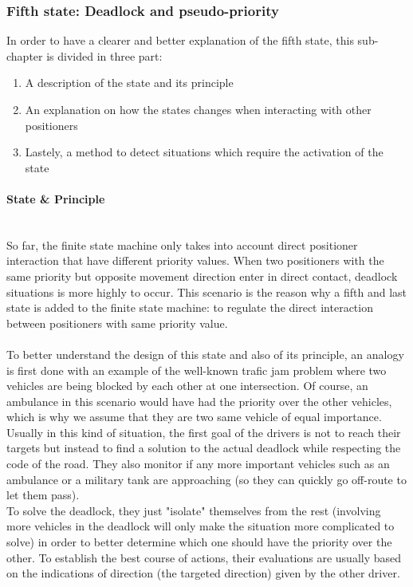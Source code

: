 \documentclass[]{spie}  %
\begin{document}
	\subsubsection{Fifth state: Deadlock and pseudo-priority}
	\label{sub_chapter_fifth_state}
	In order to have a clearer and better explanation of the fifth state, this sub-chapter is divided in three part: 
	\begin{enumerate}
		\item A description of the state and its principle 
		\item An explanation on how the states changes when interacting with other positioners
		\item Lastely, a method to detect situations which require the activation of the state
	\end{enumerate}
	
	\paragraph{State \& Principle}\mbox{}\\
	
	So far, the finite state machine only takes into account direct positioner interaction that have different priority values.
	When two positioners with the same priority but opposite movement direction enter in direct contact, deadlock situations is more highly to occur. This scenario is the reason why a fifth and last state is added to the finite state machine: to regulate the direct interaction between positioners with same priority value.\\\\	
	To better understand the design of this state and also of its principle, an analogy is first done with an example of the well-known trafic jam problem where two vehicles are being blocked by each other at one intersection. Of course, an ambulance in this scenario would have had the priority over the other vehicles, which is why we assume that they are two same vehicle of equal importance.\\
	Usually in this kind of situation, the first goal of the drivers is not to reach their targets but instead to find a solution to the actual deadlock while respecting the code of the road. They also monitor if any more important vehicles such as an ambulance or a military tank are approaching (so they can quickly go off-route to let them pass).\\ 
	To solve the deadlock, they just "isolate" themselves from the rest (involving more vehicles in the deadlock will only make the situation more complicated to solve)  in order to better determine which one should have the priority over the other. 
	To establish the best course of actions, their evaluations are usually based on the indications of direction (the targeted direction) given by the other driver.\\
	
\end{document}
